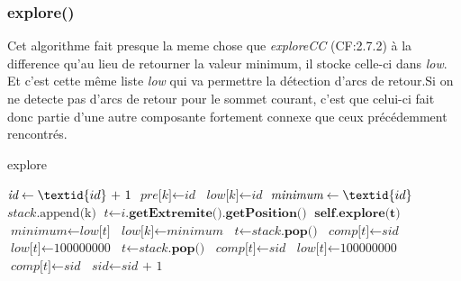 \documentclass[a4paper]{article}
\begin{document}
\subsubsection{explore()}
Cet algorithme fait presque la meme chose que \textit{exploreCC} (CF:2.7.2) à la difference qu'au lieu de retourner la valeur minimum, il stocke celle-ci dans \textit{low}. Et c'est cette  même liste \textit{low} qui va permettre la détection d'arcs de retour.Si on ne detecte pas d'arcs de retour pour le sommet courant, c'est que celui-ci fait donc partie d'une autre composante fortement connexe que ceux précédemment rencontrés.
\begin{algorithm}[H]
\caption{explore}\label{explore}
\begin{algorithmic}[1]
\State $\textit{id} \gets \textid{id}\text{ + 1} $
\State $\textit{pre[k]} \gets \textit{id} $
\State $\textit{low[k]} \gets \textit{id} $
\State $\textit{minimum} \gets \textid{id} $
\State $\textit{stack}\text{.append(k)} $
\State $\textit{t}\gets \textit{i}\textbf{.getExtremite().getPosition()}$
\State $\textbf{self.explore(t)}$
\EndIf
{}
\State $\textit{minimum}\gets \textit{low[t]}$
\EndIf
\EndIf
\EndFor
{}
\State $\textit{low[k]}\gets \textit{minimum}$
\EndIf
\Else
\State $\textit{t}\gets \textit{stack}\textbf{.pop()}$
\State $\textit{comp[t]}\gets \textit{sid}$
\State $\textit{low[t]}\gets \text{100000000}$
\State $\textit{t}\gets \textit{stack}\textbf{.pop()}$
\State $\textit{comp[t]}\gets \textit{sid}$
\State $\textit{low[t]}\gets \text{100000000}$
\EndWhile
\State $\textit{comp[t]}\gets \textit{sid}$
\State $\textit{sid}\gets \textit{sid + 1}$
\EndIf
\EndProcedure
\end{algorithmic}
\end{algorithm}
\end{document}
